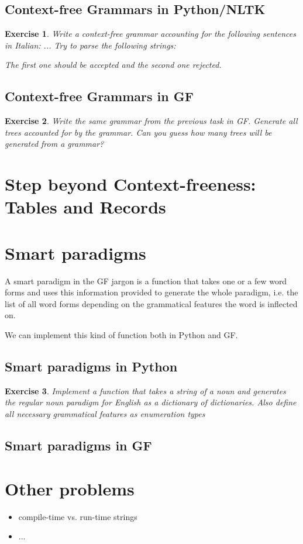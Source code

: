 \documentclass{scrartcl}
\newtheorem{exercise}{Exercise}
\begin{document}
\subsection{Context-free Grammars in Python/NLTK}



\begin{exercise}
  Write a context-free grammar accounting for the following sentences in Italian:
  ...
  Try to parse the following strings:

  The first one should be accepted and the second one rejected.
\end{exercise}
\subsection{Context-free Grammars in GF}



\begin{exercise}
  Write the same grammar from the previous task in GF. Generate all trees accounted for by the grammar. Can you guess how many trees will be
  generated from a grammar?
\end{exercise}
\section{Step beyond Context-freeness: Tables and Records}
\section{Smart paradigms}
A smart paradigm in the GF jargon is a function that takes one or a few word forms and uses this information provided to generate the whole paradigm, i.e. the list of all word forms depending on the grammatical features the word is inflected on.

We can implement this kind of function both in Python and GF.
\subsection{Smart paradigms in Python}
\begin{exercise}
  Implement a function that takes a string of a noun and generates the regular noun paradigm for English as a dictionary of dictionaries. Also define all necessary grammatical features as enumeration types
\end{exercise}
\subsection{Smart paradigms in GF}


\section{Other problems}
\begin{itemize}
\item compile-time vs. run-time strings
\item ...
\end{itemize}
\end{document}
